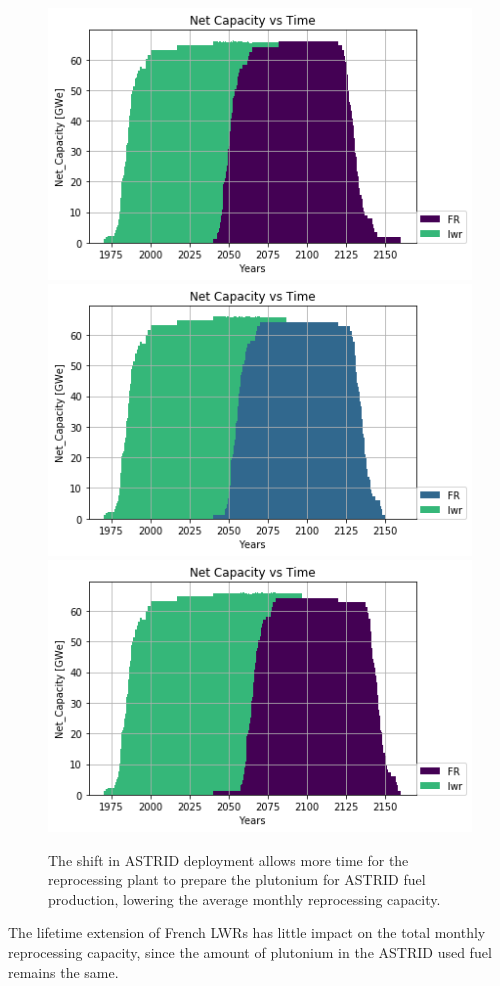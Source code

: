 \begin{figure}[htbp!]
    \begin{center}
        \includegraphics[height=0.25\textheight]{./images/sensitivity/5.png}
        \includegraphics[height=0.25\textheight]{./images/sensitivity/10.png}
        \includegraphics[height=0.25\textheight]{./images/sensitivity/20.png}
    \end{center}
    \caption{The shift in \gls{ASTRID} deployment allows more time for the reprocessing
             plant to prepare the plutonium for \gls{ASTRID} fuel production, lowering
             the average monthly reprocessing capacity.}
    \label{fig:ext}
\end{figure}


The lifetime extension of French \glspl{LWR} has little impact on the total
monthly reprocessing capacity, since the amount of plutonium in the \gls{ASTRID} used fuel
remains the same.
